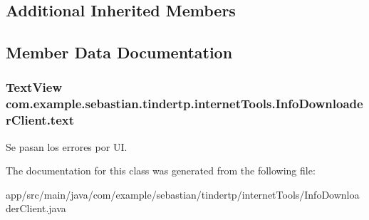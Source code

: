 \subsection*{Additional Inherited Members}


\subsection{Member Data Documentation}
\subsubsection[{\texorpdfstring{text}{text}}]{\setlength{\rightskip}{0pt plus 5cm}Text\+View com.\+example.\+sebastian.\+tindertp.\+internet\+Tools.\+Info\+Downloader\+Client.\+text}\hypertarget{classcom_1_1example_1_1sebastian_1_1tindertp_1_1internetTools_1_1InfoDownloaderClient_af7bc063a43057f8926845d9d0b636ca6}{}\label{classcom_1_1example_1_1sebastian_1_1tindertp_1_1internetTools_1_1InfoDownloaderClient_af7bc063a43057f8926845d9d0b636ca6}
Se pasan los errores por UI. 

The documentation for this class was generated from the following file\+:\begin{DoxyCompactItemize}
\item 
app/src/main/java/com/example/sebastian/tindertp/internet\+Tools/Info\+Downloader\+Client.\+java\end{DoxyCompactItemize}
